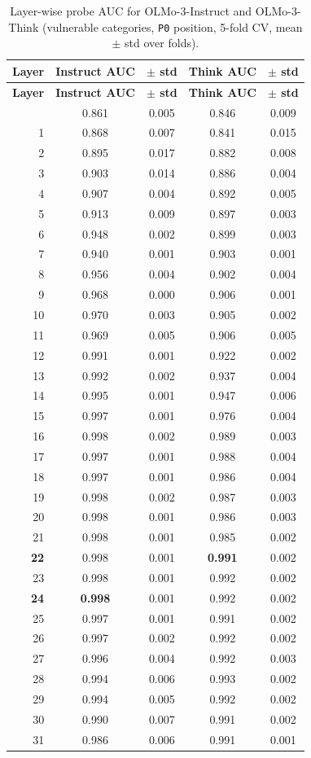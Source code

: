 \documentclass[accepted]{article}
\newcommand{\pzero}{\texttt{P0}}
\begin{document}
\begin{longtable}{rcccc}
\caption{Layer-wise probe AUC for OLMo-3-Instruct and OLMo-3-Think
  (vulnerable categories, \pzero{} position, 5-fold CV,
  mean $\pm$ std over folds).}
\label{tab:olmo_probe_layers} \\
\toprule
\textbf{Layer} & \textbf{Instruct AUC} & \textbf{$\pm$ std} & \textbf{Think AUC} & \textbf{$\pm$ std} \\
\midrule
\endfirsthead
\toprule
\textbf{Layer} & \textbf{Instruct AUC} & \textbf{$\pm$ std} & \textbf{Think AUC} & \textbf{$\pm$ std} \\
\midrule
\endhead
\bottomrule
\endfoot
 0 & 0.861 & 0.005 & 0.846 & 0.009 \\
 1 & 0.868 & 0.007 & 0.841 & 0.015 \\
 2 & 0.895 & 0.017 & 0.882 & 0.008 \\
 3 & 0.903 & 0.014 & 0.886 & 0.004 \\
 4 & 0.907 & 0.004 & 0.892 & 0.005 \\
 5 & 0.913 & 0.009 & 0.897 & 0.003 \\
 6 & 0.948 & 0.002 & 0.899 & 0.003 \\
 7 & 0.940 & 0.001 & 0.903 & 0.001 \\
 8 & 0.956 & 0.004 & 0.902 & 0.004 \\
 9 & 0.968 & 0.000 & 0.906 & 0.001 \\
10 & 0.970 & 0.003 & 0.905 & 0.002 \\
11 & 0.969 & 0.005 & 0.906 & 0.005 \\
12 & 0.991 & 0.001 & 0.922 & 0.002 \\
13 & 0.992 & 0.002 & 0.937 & 0.004 \\
14 & 0.995 & 0.001 & 0.947 & 0.006 \\
15 & 0.997 & 0.001 & 0.976 & 0.004 \\
16 & 0.998 & 0.002 & 0.989 & 0.003 \\
17 & 0.997 & 0.001 & 0.988 & 0.004 \\
18 & 0.997 & 0.001 & 0.986 & 0.004 \\
19 & 0.998 & 0.002 & 0.987 & 0.003 \\
20 & 0.998 & 0.001 & 0.986 & 0.003 \\
21 & 0.998 & 0.001 & 0.985 & 0.002 \\
\textbf{22} & 0.998 & 0.001 & \textbf{0.991} & 0.002 \\
23 & 0.998 & 0.001 & 0.992 & 0.002 \\
\textbf{24} & \textbf{0.998} & 0.001 & 0.992 & 0.002 \\
25 & 0.997 & 0.001 & 0.991 & 0.002 \\
26 & 0.997 & 0.002 & 0.992 & 0.002 \\
27 & 0.996 & 0.004 & 0.992 & 0.003 \\
28 & 0.994 & 0.006 & 0.993 & 0.002 \\
29 & 0.994 & 0.005 & 0.992 & 0.002 \\
30 & 0.990 & 0.007 & 0.991 & 0.002 \\
31 & 0.986 & 0.006 & 0.991 & 0.001 \\
\end{longtable}
\end{document}
